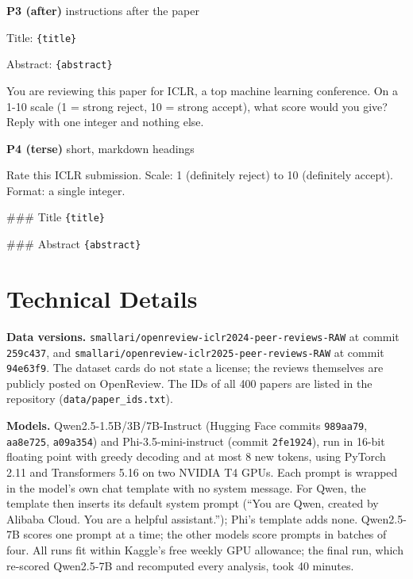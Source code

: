 \documentclass[11pt]{article}
\newcommand{\slot}[1]{\textcolor{blue!55!black}{\texttt{\{#1\}}}}
\begin{document}
\begin{promptbox}{\textbf{P3 (after)} \enspace instructions after the paper}
\begin{prompttext}
Title: \slot{title}

Abstract: \slot{abstract}

You are reviewing this paper for ICLR, a top machine learning conference. On a 1-10 scale (1 = strong reject, 10 = strong accept), what score would you give? Reply with one integer and nothing else.
\end{prompttext}
\end{promptbox}

\begin{promptbox}{\textbf{P4 (terse)} \enspace short, markdown headings}
\begin{prompttext}
Rate this ICLR submission.
Scale: 1 (definitely reject) to 10 (definitely accept).
Format: a single integer.

### Title
\slot{title}

### Abstract
\slot{abstract}
\end{prompttext}
\end{promptbox}

\section{Technical Details}
\label{app:details}

{\sloppy \textbf{Data versions.} \texttt{smallari/\allowbreak openreview-\allowbreak iclr2024-\allowbreak peer-\allowbreak reviews-\allowbreak RAW} at commit \texttt{259c437}, and \texttt{smallari/\allowbreak openreview-\allowbreak iclr2025-\allowbreak peer-\allowbreak reviews-\allowbreak RAW} at commit \texttt{94e63f9}. The dataset cards do not state a license; the reviews themselves are publicly posted on OpenReview. The IDs of all 400 papers are listed in the repository (\texttt{data/paper\_ids.txt}).\par}

\textbf{Models.} Qwen2.5-1.5B/3B/7B-Instruct (Hugging Face commits \texttt{989aa79}, \texttt{aa8e725}, \texttt{a09a354}) and Phi-3.5-mini-instruct (commit \texttt{2fe1924}), run in 16-bit floating point with greedy decoding and at most 8 new tokens, using PyTorch 2.11 and Transformers 5.16 on two NVIDIA T4 GPUs. Each prompt is wrapped in the model's own chat template with no system message. For Qwen, the template then inserts its default system prompt (``You are Qwen, created by Alibaba Cloud. You are a helpful assistant.''); Phi's template adds none. Qwen2.5-7B scores one prompt at a time; the other models score prompts in batches of four. All runs fit within Kaggle's free weekly GPU allowance; the final run, which re-scored Qwen2.5-7B and recomputed every analysis, took 40 minutes.
\end{document}
